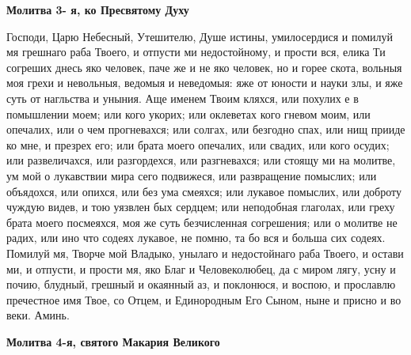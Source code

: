 \medskip
\bfseries Молитва 3- я, ко Пресвятому Духу\normalfont{}\nopagebreak


Господи, Царю Небесный, Утешителю, Душе истины, умилосердися и помилуй мя грешнаго раба Твоего, и отпусти ми недостойному, и прости вся, елика Ти согреших днесь яко человек, паче же и не яко человек, но и горее скота, вольныя моя грехи и невольныя, ведомыя и неведомыя: яже от юности и науки злы, и яже суть от нагльства и уныния. Аще именем Твоим кляхся, или похулих е в помышлении моем; или кого укорих; или оклеветах кого гневом моим, или опечалих, или о чем прогневахся; или солгах, или безгодно спах, или нищ прииде ко мне, и презрех его; или брата моего опечалих, или свадих, или кого осудих; или развеличахся, или разгордехся, или разгневахся; или стоящу ми на молитве, ум мой о лукавствии мира сего подвижеся, или развращение помыслих; или объядохся, или опихся, или без ума смеяхся; или лукавое помыслих, или доброту чуждую видев, и тою уязвлен бых сердцем; или неподобная глаголах, или греху брата моего посмеяхся, моя же суть безчисленная согрешения; или о молитве не радих, или ино что содеях лукавое, не помню, та бо вся и больша сих содеях. Помилуй мя, Творче мой Владыко, унылаго и недостойнаго раба Твоего, и остави ми, и отпусти, и прости мя, яко Благ и Человеколюбец, да с миром лягу, усну и почию, блудный, грешный и окаянный аз, и поклонюся, и воспою, и прославлю пречестное имя Твое, со Отцем, и Единородным Его Сыном, ныне и присно и во веки. Аминь.


\medskip
\bfseries Молитва 4-я, святого Макария Великого\normalfont{}\nopagebreak


